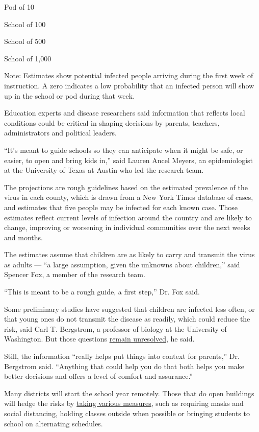 Pod of 10

School of 100

School of 500

School of 1,000

Note: Estimates show potential infected people arriving during the first
week of instruction. A zero indicates a low probability that an infected
person will show up in the school or pod during that week.

Education experts and disease researchers said information that reflects
local conditions could be critical in shaping decisions by parents,
teachers, administrators and political leaders.

``It's meant to guide schools so they can anticipate when it might be
safe, or easier, to open and bring kids in,'' said Lauren Ancel Meyers,
an epidemiologist at the University of Texas at Austin who led the
research team.

The projections are rough guidelines based on the estimated prevalence
of the virus in each county, which is drawn from a New York Times
database of cases, and estimates that five people may be infected for
each known case. Those estimates reflect current levels of infection
around the country and are likely to change, improving or worsening in
individual communities over the next weeks and months.

The estimates assume that children are as likely to carry and transmit
the virus as adults --- ``a large assumption, given the unknowns about
children,'' said Spencer Fox, a member of the research team.

``This is meant to be a rough guide, a first step,'' Dr. Fox said.

Some preliminary studies have suggested that children are infected less
often, or that young ones do not transmit the disease as readily, which
could reduce the risk, said Carl T. Bergstrom, a professor of biology at
the University of Washington. But those questions
\href{https://www.nytimes.com/2020/07/30/health/coronavirus-children.html}{remain
unresolved}, he said.

Still, the information ``really helps put things into context for
parents,'' Dr. Bergstrom said. ``Anything that could help you do that
both helps you make better decisions and offers a level of comfort and
assurance.''

Many districts will start the school year remotely. Those that do open
buildings will hedge the risks by
\href{https://www.nytimes.com/interactive/2020/07/29/us/schools-reopening-coronavirus.html}{taking
various measures}, such as requiring masks and social distancing,
holding classes outside when possible or bringing students to school on
alternating schedules.

